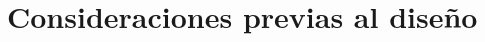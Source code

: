\pagestyle{allpages}
\setcounter{page}{1}


\section{Consideraciones previas al diseño}
\resetallcounters

\clearpage


